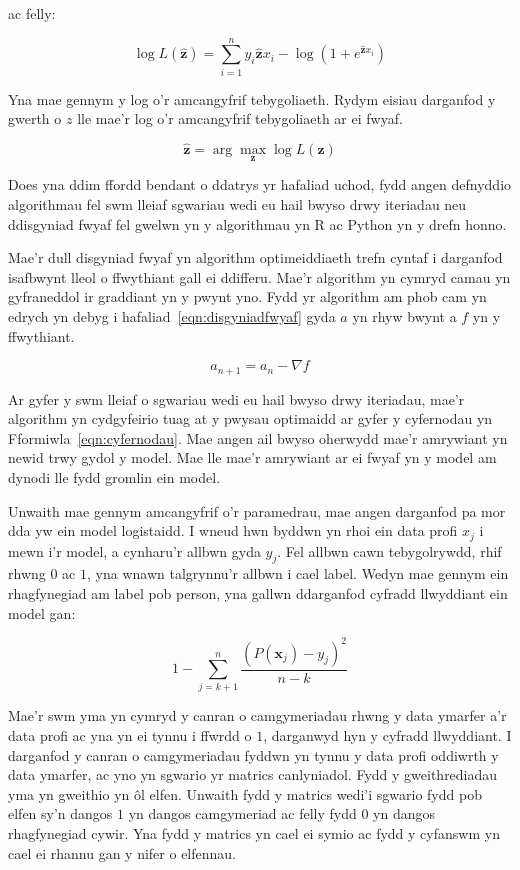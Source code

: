ac felly:

$$ \log L(\hat{\mathbf{z}}) = \sum_{i=1}^{n} y_i \hat{\mathbf{z}} x_i - \log(1 + e^{\hat{\mathbf{z}} x_i}) $$

Yna mae gennym y log o'r amcangyfrif tebygoliaeth. Rydym eisiau darganfod y gwerth o $z$ lle mae'r log o'r amcangyfrif tebygoliaeth ar ei fwyaf.

$$ \hat{\mathbf{z}} = \arg \max_{\mathbf{z}} \log L(\mathbf{z})  $$

Does yna ddim ffordd bendant o ddatrys yr hafaliad uchod, fydd angen defnyddio algorithmau fel swm lleiaf sgwariau wedi eu hail bwyso drwy iteriadau neu ddisgyniad fwyaf fel gwelwn yn y algorithmau yn R ac Python yn y drefn honno. 

Mae'r dull disgyniad fwyaf yn algorithm optimeiddiaeth trefn cyntaf i darganfod isafbwynt lleol o ffwythiant gall ei ddifferu. Mae'r algorithm yn cymryd camau yn gyfraneddol ir graddiant yn y pwynt yno. Fydd yr algorithm am phob cam yn edrych yn debyg i hafaliad~\ref{eqn:disgyniadfwyaf} gyda $a$ yn rhyw bwynt a $f$ yn y ffwythiant.

\begin{equation}\label{eqn:disgyniadfwyaf}
  a_{n+1} = a_{n} - \nabla f
\end{equation}

Ar gyfer y swm lleiaf o sgwariau wedi eu hail bwyso drwy iteriadau, mae'r algorithm yn cydgyfeirio tuag at y pwysau optimaidd ar gyfer y cyfernodau yn Fformiwla~\ref{eqn:cyfernodau}. Mae angen ail bwyso oherwydd mae'r amrywiant yn newid trwy gydol y model. Mae lle mae'r amrywiant ar ei fwyaf yn y model am dynodi lle fydd gromlin ein model.

Unwaith mae gennym amcangyfrif o'r paramedrau, mae angen darganfod pa mor dda yw ein model logistaidd. I wneud hwn byddwn yn rhoi ein data profi $x_j$ i mewn i'r model, a cynharu'r allbwn gyda $y_j$. Fel allbwn cawn tebygolrywdd, rhif rhwng $0$ ac $1$, yna wnawn talgrynnu'r allbwn i cael label. Wedyn mae gennym ein rhagfynegiad am label pob person, yna gallwn ddarganfod cyfradd llwyddiant ein model gan:

$$ 1 - \sum_{j = k+1}^{n} \frac{(P(\mathbf{x}_j) - y_j)^{2}}{n - k} $$

Mae'r swm yma yn cymryd y canran o camgymeriadau rhwng y data ymarfer a'r data profi ac yna yn ei tynnu i ffwrdd o $1$, darganwyd hyn y cyfradd llwyddiant. I darganfod y canran o camgymeriadau fyddwn yn tynnu y data profi oddiwrth y data ymarfer, ac yno yn sgwario yr matrics canlyniadol. Fydd y gweithrediadau yma yn gweithio yn \^{o}l elfen. Unwaith fydd y matrics wedi'i sgwario fydd pob elfen sy'n dangos $1$ yn dangos camgymeriad ac felly fydd $0$ yn dangos rhagfynegiad cywir. Yna fydd y matrics yn cael ei symio ac fydd y cyfanswm yn cael ei rhannu gan y nifer o elfennau.

